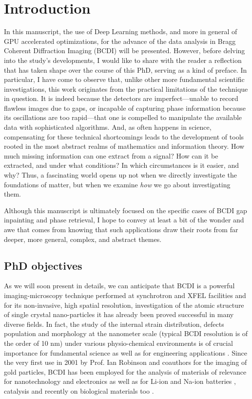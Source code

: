 \section{Introduction}\label{chp:intro}

In this manuscript, the use of Deep Learning methods, and more in general of GPU accelerated optimizations, for the advance of 
the data analysis in Bragg Coherent Diffraction Imaging (BCDI) will be presented. However, before delving into the 
study’s developments, I would like to share with the reader a reflection that has taken shape over the course of this 
PhD, serving as a kind of preface. In particular, I have come to observe that, unlike other more fundamental 
scientific investigations, this work originates from the practical limitations of the technique in question. 
It is indeed because the detectors are imperfect—unable to record flawless images due to gaps, or incapable of 
capturing phase information because its oscillations are too rapid—that one is compelled to manipulate the available 
data with sophisticated algorithms. And, as often happens in science, compensating for these technical shortcomings 
leads to the development of tools rooted in the most abstract realms of mathematics and information theory. How much 
missing information can one extract from a signal? How can it be extracted, and under what conditions? In which 
circumstances is it easier, and why? Thus, a fascinating world opens up not when we directly investigate the foundations 
of matter, but when we examine \textit{how} we go about investigating them. 

Although this manuscript is ultimately focused on the specific cases of BCDI gap inpainting and phase retrieval, 
I hope to convey at least a bit of the wonder and awe that comes from knowing that such applications draw their roots 
from far deeper, more general, complex, and abstract themes.

\subsection{PhD objectives}

As we will soon present in details, we can anticipate that BCDI is a powerful imaging-microscopy technique performed at synchrotron 
and XFEL facilities and for its non-invasive, high spatial resolution, investigation of the atomic structure of single crystal 
nano-particles it has already been proved successful in many diverse fields. In fact, the study of the internal 
strain distribution, defects population and morphology at the nanometer scale (typical BCDI resolution is of the order of 10 nm) 
under various physio-chemical environments is of crucial importance for fundamental science as well as for engineering 
applications \cite{BCDI_review2024}. Since the very first use in 2001 by Prof. Ian Robinson and coauthors \cite{Robinson_gold_2001} for the imaging 
of gold particles, BCDI has been employed for the analysis of materials of relevance for nanotechnology and electronics 
\cite{Favre-Nicolin_2010} as well as for Li-ion and Na-ion batteries \cite{Singer2018, Serban2024}, catalysis 
\cite{atlan_imaging_2023} and recently on biological materials too \cite{Grunewald:ro5042}. 

